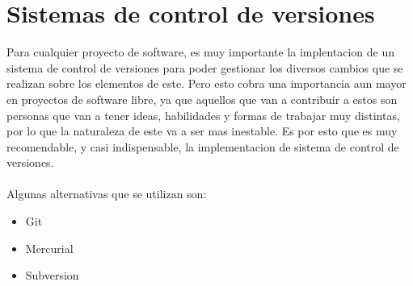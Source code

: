 \section{Sistemas de control de versiones}

Para cualquier proyecto de software, es muy importante la implentacion de un sistema de control de versiones para poder gestionar los diversos cambios que se realizan sobre los elementos de este.
Pero esto cobra una importancia aun mayor en proyectos de software libre, ya que aquellos que van a contribuir a estos son personas que van a tener ideas, habilidades y formas de trabajar muy distintas, por lo que la naturaleza de este va a ser mas inestable.
Es por esto que es muy recomendable, y casi indispensable, la implementacion de sistema de control de versiones.
\\
\\
Algunas alternativas que se utilizan son:
\begin{itemize}
    \item Git
    \item Mercurial
    \item Subversion    
\end{itemize}
